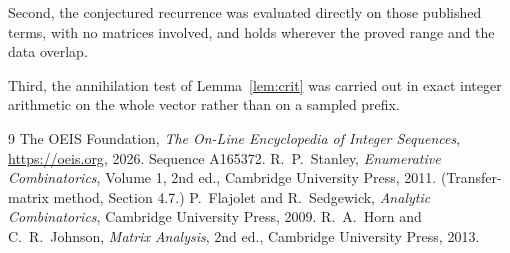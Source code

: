 \documentclass[11pt,a4paper]{article}
\theoremstyle{plain}
\theoremstyle{definition}
\begin{document}
Second, the conjectured recurrence was evaluated directly on those published terms, with no
matrices involved, and holds wherever the proved range and the data overlap.

Third, the annihilation test of Lemma~\ref{lem:crit} was carried out in exact integer
arithmetic on the whole vector rather than on a sampled prefix.

\begin{thebibliography}{9}
 The OEIS Foundation, \emph{The On-Line Encyclopedia of Integer
Sequences}, \url{https://oeis.org}, 2026. Sequence A165372.
 R.~P.~Stanley, \emph{Enumerative Combinatorics}, Volume 1, 2nd ed.,
Cambridge University Press, 2011. (Transfer-matrix method, Section 4.7.)
 P.~Flajolet and R.~Sedgewick, \emph{Analytic Combinatorics}, Cambridge
University Press, 2009.
 R.~A.~Horn and C.~R.~Johnson, \emph{Matrix Analysis}, 2nd ed., Cambridge
University Press, 2013.
\end{thebibliography}
\end{document}
